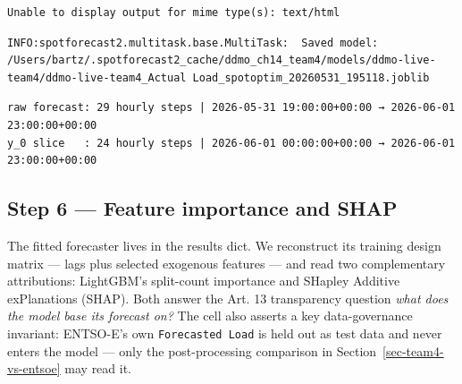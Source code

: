 \documentclass[
  english,
  letterpaper,
]{scrbook}
\begin{document}
\protect{}\label{team4-train-31}
\begin{verbatim}
Unable to display output for mime type(s): text/html
\end{verbatim}

\begin{verbatim}
INFO:spotforecast2.multitask.base.MultiTask:  Saved model: /Users/bartz/.spotforecast2_cache/ddmo_ch14_team4/models/ddmo-live-team4/ddmo-live-team4_Actual Load_spotoptim_20260531_195118.joblib
\end{verbatim}

\begin{verbatim}
raw forecast: 29 hourly steps | 2026-05-31 19:00:00+00:00 → 2026-06-01 23:00:00+00:00
y_0 slice   : 24 hourly steps | 2026-06-01 00:00:00+00:00 → 2026-06-01 23:00:00+00:00
\end{verbatim}

\subsection{Step 6 --- Feature importance and
SHAP}\label{sec-team4-importance}

The fitted forecaster lives in the results dict. We reconstruct its
training design matrix --- lags plus selected exogenous features --- and
read two complementary attributions: LightGBM's split-count importance
and SHapley Additive exPlanations (SHAP). Both answer the Art. 13
transparency question \emph{what does the model base its forecast on?}
The cell also asserts a key data-governance invariant: ENTSO-E's own
\texttt{Forecasted\ Load} is held out as test data and never enters the
model --- only the post-processing comparison in
Section~\ref{sec-team4-vs-entsoe} may read it.
\end{document}
